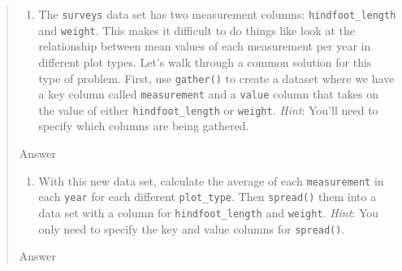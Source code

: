 \documentclass[]{book}
\newenvironment{Shaded}{\begin{snugshade}}{\end{snugshade}}
\newcommand{\KeywordTok}[1]{\textcolor[rgb]{0.13,0.29,0.53}{\textbf{#1}}}
\newcommand{\DataTypeTok}[1]{\textcolor[rgb]{0.13,0.29,0.53}{#1}}
\newcommand{\StringTok}[1]{\textcolor[rgb]{0.31,0.60,0.02}{#1}}
\newcommand{\OtherTok}[1]{\textcolor[rgb]{0.56,0.35,0.01}{#1}}
\newcommand{\OperatorTok}[1]{\textcolor[rgb]{0.81,0.36,0.00}{\textbf{#1}}}
\newcommand{\NormalTok}[1]{#1}
\providecommand{\tightlist}{%
  \setlength{\itemsep}{0pt}\setlength{\parskip}{0pt}}
\begin{document}
\begin{quote}
\begin{enumerate}
\def\labelenumi{\arabic{enumi}.}
\setcounter{enumi}{2}
\tightlist
\item
  The \texttt{surveys} data set has two measurement columns:
  \texttt{hindfoot\_length} and \texttt{weight}. This makes it difficult
  to do things like look at the relationship between mean values of each
  measurement per year in different plot types. Let's walk through a
  common solution for this type of problem. First, use \texttt{gather()}
  to create a dataset where we have a key column called
  \texttt{measurement} and a \texttt{value} column that takes on the
  value of either \texttt{hindfoot\_length} or \texttt{weight}.
  \emph{Hint}: You'll need to specify which columns are being gathered.
\end{enumerate}

Answer

\begin{Shaded}
\end{Shaded}

\begin{enumerate}
\def\labelenumi{\arabic{enumi}.}
\setcounter{enumi}{3}
\tightlist
\item
  With this new data set, calculate the average of each
  \texttt{measurement} in each \texttt{year} for each different
  \texttt{plot\_type}. Then \texttt{spread()} them into a data set with
  a column for \texttt{hindfoot\_length} and \texttt{weight}.
  \emph{Hint}: You only need to specify the key and value columns for
  \texttt{spread()}.
\end{enumerate}

Answer

\begin{Shaded}
\end{Shaded}
\end{quote}
\end{document}
